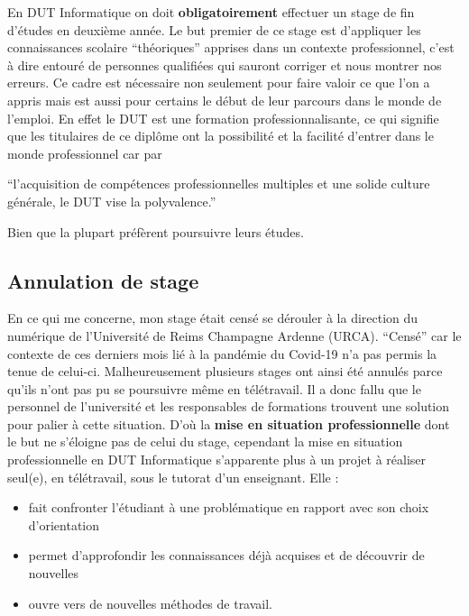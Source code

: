 \documentclass[11pt,a4paper,krantz2,11pt,oneside]{krantz}
\providecommand{\tightlist}{%
  \setlength{\itemsep}{0pt}\setlength{\parskip}{0pt}}
\renewenvironment{quote}{\begin{VF}}{\end{VF}}
\begin{document}
En DUT Informatique on doit \textbf{obligatoirement} effectuer un stage de fin d'études en deuxième année. Le but premier de ce stage est d'appliquer les connaissances scolaire ``théoriques'' apprises dans un contexte professionnel, c'est à dire entouré de personnes qualifiées qui sauront corriger et nous montrer nos erreurs. Ce cadre est nécessaire non seulement pour faire valoir ce que l'on a appris mais est aussi pour certains le début de leur parcours dans le monde de l'emploi. En effet le DUT est une formation professionnalisante, ce qui signifie que les titulaires de ce diplôme ont la possibilité et la facilité d'entrer dans le monde professionnel car par

\begin{quote}
``l'acquisition de compétences professionnelles multiples et une solide culture générale, le DUT vise la polyvalence.''

\end{quote}

Bien que la plupart préfèrent poursuivre leurs études.

\hypertarget{annulation-de-stage}{%
\subsection{Annulation de stage}\label{annulation-de-stage}}

En ce qui me concerne, mon stage était censé se dérouler à la direction du numérique de l'Université de Reims Champagne Ardenne (URCA). ``Censé'' car le contexte de ces derniers mois lié à la pandémie du Covid-19 n'a pas permis la tenue de celui-ci. Malheureusement plusieurs stages ont ainsi été annulés parce qu'ils n'ont pas pu se poursuivre même en télétravail. Il a donc fallu que le personnel de l'université et les responsables de formations trouvent une solution pour palier à cette situation. D'où la \textbf{mise en situation professionnelle} dont le but ne s'éloigne pas de celui du stage, cependant la mise en situation professionnelle en DUT Informatique s'apparente plus à un projet à réaliser seul(e), en télétravail, sous le tutorat d'un enseignant. Elle :

\begin{itemize}
\tightlist
\item
  fait confronter l'étudiant à une problématique en rapport avec son choix d'orientation
\item
  permet d'approfondir les connaissances déjà acquises et de découvrir de nouvelles
\item
  ouvre vers de nouvelles méthodes de travail.
\end{itemize}
\end{document}
